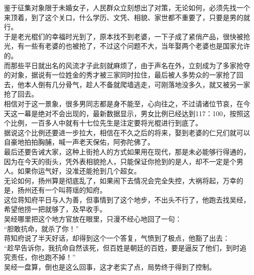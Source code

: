 \begin{multicols}{\theparacolNo}
鉴于征集对象限于未婚女子，人民群众立刻想出了对策，无论如何，必须先找一个来顶着，到了这个关口，什么学历、文凭、相貌、家世都不重要了，只要是男的就行。\\

于是老光棍们的幸福时光到了，原本找不到老婆，一下子成了紧俏产品，很快被抢光，有一些有老婆的也被抢了，不过这个问题不大，当年娶两个老婆也是国家允许的。\\

而那些平日就出名的风流才子此刻就麻烦了，由于声名在外，立刻成为了多家抢夺的对象，据说有一位姓金的秀才被三家同时拉住，最后被人多势众的一家抢了回去，他本人倒有几分骨气，趁人不备就爬墙逃走，可刚落地没多久，就又被另一家抢了回去。\\

相信对于这一景象，很多男同志都是身不能至，心向往之，不过请诸位节哀，在今天这一幕是绝对不会出现的，最新数据显示，男女比例已经达到117：100，按照这个比例，一百多人中就有十七位先生是注定要将光棍进行到底了。\\

据说这个比例还要进一步拉大，相信在不久之后的将来，娶到老婆的仁兄们就可以自豪地拍拍胸脯，喊一声老天保佑，阿弥陀佛了。\\

最后还要告诫大家，这种上街抢人的方式如果用在现代，那是未必能够行得通的，因为在今天的街头，凭外表相貌抢人，只能保证你抢到的是人，却不一定是个男人。如果你运气好，没准还能抢到几个超女。\\

无论如何，扬州算是彻底乱了，如果闹下去情况会完全失控，大祸将起，万幸的是，扬州还有一个叫蒋瑶的知府。\\

这位蒋知府平日与人为善，但事情到了这个地步，不出头不行了，他跑去找吴经，希望他捞一把就够了，及早收手。\\

吴经哪里把这个地方官放在眼里，只漫不经心地回了一句：\\

“胆敢抗命，就杀了你！”\\

蒋知府说了半天好话，却得到这个一个答复，气愤到了极点，他豁了出去：\\

“趁早告诉你，我抗命自然该死，但百姓是朝廷的百姓，要是逼反了他们，到时追究责任，你也跑不掉！”\\

吴经一盘算，倒也是这么回事，这才老实了点，局势终于得到了控制。\\


\end{multicols}

